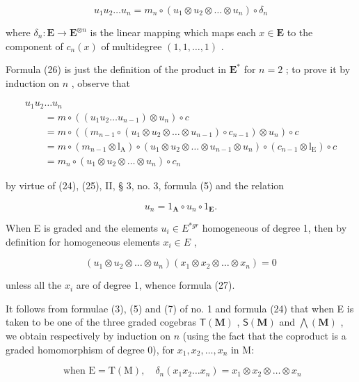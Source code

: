 \[
u _ {1} u _ {2} \dots u _ {n} = m _ {n} \circ (u _ {1} \otimes u _ {2} \otimes \dots \otimes u _ {n}) \circ \delta_ {n}\tag{27}
\]

where \(\delta_n: \mathbf{E} \to \mathbf{E}^{\otimes n}\) is the linear mapping which maps each \(x \in \mathbf{E}\) to the component of \(c_n(x)\) of multidegree \((1, 1, \ldots, 1)\) .

Formula (26) is just the definition of the product in \(\mathbf{E}^*\) for \(n = 2\) ; to prove it by induction on \(n\) , observe that

\[
\begin{array}{l} u _ {1} u _ {2} \dots u _ {n} \\ \qquad = m \circ ((u _ {1} u _ {2} \dots u _ {n - 1}) \otimes u _ {n}) \circ c \\ \qquad = m \circ ((m _ {n - 1} \circ (u _ {1} \otimes u _ {2} \otimes \dots \otimes u _ {n - 1}) \circ c _ {n - 1}) \otimes u _ {n}) \circ c \\ \qquad = m \circ (m _ {n - 1} \otimes \mathrm{l} _ {\mathrm{A}}) \circ (u _ {1} \otimes u _ {2} \otimes \dots \otimes u _ {n - 1} \otimes u _ {n}) \circ (c _ {n - 1} \otimes \mathrm{l} _ {\mathrm{E}}) \circ c \\ \qquad = m _ {n} \circ (u _ {1} \otimes u _ {2} \otimes \dots \otimes u _ {n}) \circ c _ {n} \end{array}
\]

by virtue of (24), (25), II, § 3, no. 3, formula (5) and the relation

\[
u _ {n} = 1 _ {\mathbf {A}} \circ u _ {n} \circ 1 _ {\mathbf {E}}.
\]

When E is graded and the elements \(u_{i} \in E^{*gr}\) homogeneous of degree 1, then by definition for homogeneous elements \(x_{i} \in E\) ,

\[
(u _ {1} \otimes u _ {2} \otimes \dots \otimes u _ {n}) (x _ {1} \otimes x _ {2} \otimes \dots \otimes x _ {n}) = 0
\]

unless all the \(x_{i}\) are of degree 1, whence formula (27).

It follows from formulae (3), (5) and (7) of no. 1 and formula (24) that when E is taken to be one of the three graded cogebras \(\mathsf{T}(\mathbf{M})\) , \(\mathsf{S}(\mathbf{M})\) and \(\bigwedge (\mathbf{M})\) , we obtain respectively by induction on \(n\) (using the fact that the coproduct is a graded homomorphism of degree 0), for \(x_{1}, x_{2}, \ldots, x_{n}\) in M:

\[
\text { when   } \mathrm{E} = \mathrm{T} (\mathrm{M}), \quad \delta_ {n} (x _ {1} x _ {2} \dots x _ {n}) = x _ {1} \otimes x _ {2} \otimes \dots \otimes x _ {n}
\]

